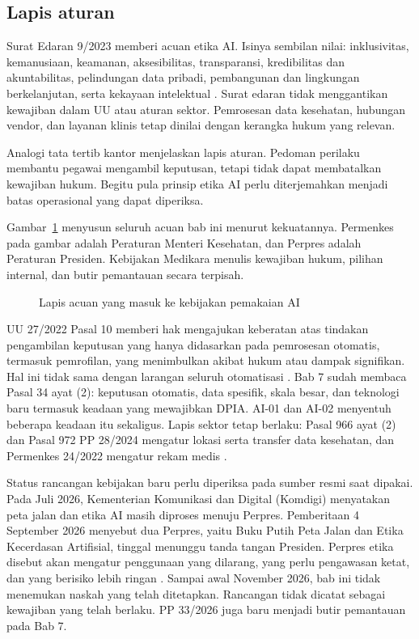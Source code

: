 \subsection*{Lapis aturan}

Surat Edaran 9/2023 memberi acuan etika AI. Isinya sembilan nilai: inklusivitas, kemanusiaan,
keamanan, aksesibilitas, transparansi, kredibilitas dan akuntabilitas, pelindungan data pribadi,
pembangunan dan lingkungan berkelanjutan, serta kekayaan intelektual \cite{c11-se9-2023}. Surat
edaran tidak menggantikan kewajiban dalam UU atau aturan sektor. Pemrosesan data kesehatan, hubungan
vendor, dan layanan klinis tetap dinilai dengan kerangka hukum yang relevan.

Analogi tata tertib kantor menjelaskan lapis aturan. Pedoman perilaku membantu pegawai mengambil
keputusan, tetapi tidak dapat membatalkan kewajiban hukum. Begitu pula prinsip etika AI perlu
diterjemahkan menjadi batas operasional yang dapat diperiksa.

Gambar~\ref{fig:ch11-lapis-acuan} menyusun seluruh acuan bab ini menurut kekuatannya. Permenkes pada
gambar adalah Peraturan Menteri Kesehatan, dan Perpres adalah Peraturan Presiden. Kebijakan Medikara
menulis kewajiban hukum, pilihan internal, dan butir pemantauan secara terpisah.

\begin{figure}[!htb]
  \centering
  
  \caption{Lapis acuan yang masuk ke kebijakan pemakaian AI}
  \label{fig:ch11-lapis-acuan}
\end{figure}

UU 27/2022 Pasal 10 memberi hak mengajukan keberatan atas tindakan pengambilan keputusan yang hanya
didasarkan pada pemrosesan otomatis, termasuk pemrofilan, yang menimbulkan akibat hukum atau dampak
signifikan. Hal ini tidak sama dengan larangan seluruh otomatisasi \cite{uu27-2022-pdp}. Bab 7 sudah
membaca Pasal 34 ayat (2): keputusan otomatis, data spesifik, skala besar, dan teknologi baru
termasuk keadaan yang mewajibkan DPIA. AI-01 dan AI-02 menyentuh beberapa keadaan itu sekaligus.
Lapis sektor tetap berlaku: Pasal 966 ayat (2) dan Pasal 972 PP 28/2024 mengatur lokasi serta
transfer data kesehatan, dan Permenkes 24/2022 mengatur rekam medis
\cite{pp28-2024-kesehatan,permenkes24-2022}.

Status rancangan kebijakan baru perlu diperiksa pada sumber resmi saat dipakai. Pada Juli 2026,
Kementerian Komunikasi dan Digital (Komdigi) menyatakan peta jalan dan etika AI masih diproses
menuju Perpres. Pemberitaan 4 September 2026 menyebut dua Perpres, yaitu Buku Putih Peta Jalan dan
Etika Kecerdasan Artifisial, tinggal menunggu tanda tangan Presiden. Perpres etika disebut akan
mengatur penggunaan yang dilarang, yang perlu pengawasan ketat, dan yang berisiko lebih ringan
\cite{c11-bisnis2026,c11-kontan2026}. Sampai awal November 2026, bab ini tidak menemukan naskah yang
telah ditetapkan. Rancangan tidak dicatat sebagai kewajiban yang telah berlaku. PP 33/2026 juga baru
menjadi butir pemantauan pada Bab 7.

